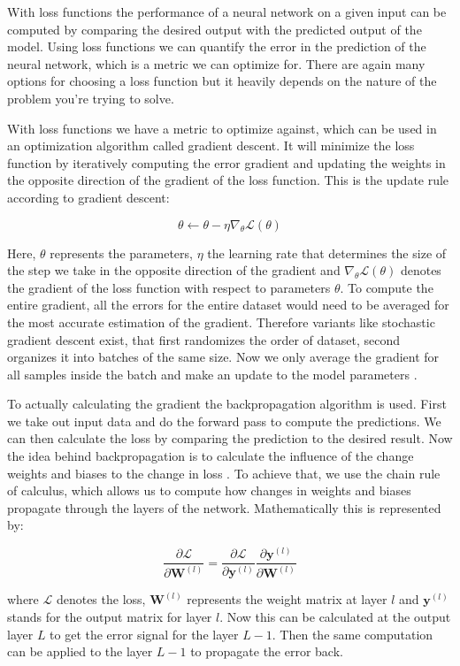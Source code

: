 \documentclass[twoside,a4paper,10pt,DIV=12,BCOR=12mm]{scrartcl}
\begin{document}
With loss functions the performance of a neural network on a given input can be computed by comparing the desired output with the 
predicted output of the model. Using loss functions we can quantify the error in the prediction of the neural network, which 
is a metric we can optimize for. There are again many options for choosing a loss function but it heavily depends on the nature of the
problem you're trying to solve.

With loss functions we have a metric to optimize against, which can be used in an optimization algorithm called 
gradient descent. It will minimize the loss function by iteratively computing the error gradient and updating
the weights in the opposite direction of the gradient of the loss function. This is the update rule according
to gradient descent: \cite{Bottou10, Goodfellow16}

$$ \theta \leftarrow \theta - \eta \nabla_{\theta}\mathcal{L}(\theta)$$

Here, $\theta$ represents the parameters, $\eta$ the learning rate that determines the size of the step we take in 
the opposite direction of the gradient and $\nabla_{\theta}\mathcal{L}(\theta)$ denotes the gradient 
of the loss function with respect to parameters $\theta$. To compute the entire gradient, all the errors for the 
entire dataset would need to be averaged for the most accurate estimation of the gradient. Therefore variants 
like stochastic gradient descent exist, that first randomizes the order of dataset, second organizes it into batches of
the same size. Now we only average the gradient for all samples inside the batch and make an update to the model parameters \cite{Bottou10}.


To actually calculating the gradient the backpropagation algorithm is used. First we take out input data and do the
forward pass to compute the predictions. We can then calculate the loss by comparing the prediction to the desired result.
Now the idea behind backpropagation is to calculate the influence of the change weights and biases to the change in loss \cite{Rumelhart86}.
To achieve that, we use the chain rule of calculus, which allows us to compute how changes in weights and biases
propagate through the layers of the network.
Mathematically this is represented by:


$$
\frac{\partial \mathcal{L}}{\partial \mathbf{W}^{(l)}} = \frac{\partial \mathcal{L}}{\partial \mathbf{y}^{(l)}} \frac{\partial \mathbf{y}^{(l)}}{\partial \mathbf{W}^{(l)}}
$$


where $\mathcal{L}$ denotes the loss, $\mathbf{W}^{(l)}$ represents the weight matrix at layer $l$ and $\mathbf{y}^{(l)}$ stands for the output matrix
for layer $l$. Now this can be calculated at the output layer $L$ to get the error signal for the layer $L-1$. 
Then the same computation can be applied to the layer $L-1$ to propagate the error back.
\end{document}
